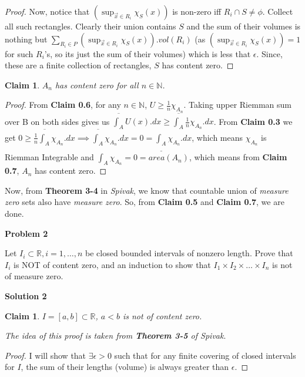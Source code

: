 \documentclass[12pt,a4paper]{article}
\newtheorem{claim}[theorem]{Claim}
\theoremstyle{definition}
\begin{document}
\begin{flushleft}
\begin{proof}
	\medskip

	Now, notice that $(\sup_{\vec{x} \in R_i} \chi_{S} (x))$ is non-zero iff $R_i \cap S \ne \phi$. Collect all such rectangles. Clearly their union contains $S$ and the sum of their volumes is nothing but $\sum_{R_i \in P} (\sup_{\vec{x} \in R_i} \chi_{S} (x)).vol(R_i)$ (as $(\sup_{\vec{x} \in R_i} \chi_{S} (x)) = 1$ for such $R_i$'s, so its just the sum of their volumes) which is less that $\epsilon$. Since, these are a finite collection of rectangles, $S$ has content zero.
\end{proof}

\begin{claim}
	$A_n$ has content zero for all $n \in \mathbb{N}$.
\end{claim}

\begin{proof}
	From {\bf Claim 0.6}, for any $n \in \mathbb{N}$, $U \ge \frac{1}{n} \chi_{A_n}$. 
	Taking upper Riemman sum over B on both sides gives us $\overline{\int_{A}} U(x).dx \ge \overline{\int_{A}} \frac{1}{n} \chi_{A_n}.dx$. From {\bf Claim 0.3} we get $0 \ge \frac{1}{n} \overline{\int_{A}} \chi_{A_n}.dx \implies \overline{\int_{A}} \chi_{A_n}.dx = 0 = \underline{\int_{A}} \chi_{A_n}.dx$, which means $\chi_{A_n}$ is Riemman Integrable and $\int_{A} \chi_{A_n} = 0 = area(A_n)$, which means from {\bf Claim 0.7}, $A_n$ has content zero.
\end{proof}

Now, from {\bf Theorem 3-4} in {\it Spivak}, we know that countable union of {\it measure zero} sets also have {\it measure zero}. So, from {\bf Claim 0.5} and {\bf Claim 0.7}, we are done.

\newpage

{\bf  Problem 2}

Let $I_i \subset \mathbb{R},i=1,\dots,n$ be closed bounded intervals of nonzero length. Prove that $I_i$ is NOT of content zero, and an induction to show that $I_1 \times I_2 \times \dots \times I_n$ is not of measure zero.

\bigskip

{\bf Solution 2}

\medskip

\begin{claim}
	$I = [a,b] \subset \mathbb{R}$, $a<b$ is not of content zero.
\end{claim}

{\it The idea of this proof is taken from {\bf Theorem 3-5} of {\it Spivak}}.

\begin{proof}
	I will show that $\exists \epsilon > 0$ such that for any finite covering of closed intervals for $I$, the sum of their lengths (volume) is always greater than $\epsilon$.


\end{proof}
\end{flushleft}
\end{document}
